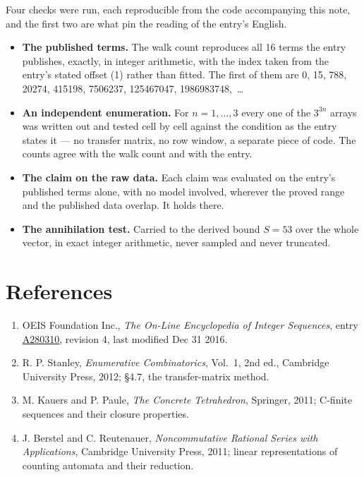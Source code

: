 \documentclass[11pt]{article}
\theoremstyle{definition}
\begin{document}
Four checks were run, each reproducible from the code accompanying this note, and the first two are what pin the reading of the entry's English.

\begin{itemize}

\item {\bfseries The published terms.} The walk count reproduces all 16 terms the entry publishes, exactly, in integer arithmetic, with the index taken from the entry's stated offset (1) rather than fitted. The first of them are 0, 15, 788, 20274, 415198, 7506237, 125467047, 1986983748,~\dots

\item {\bfseries An independent enumeration.} For $n = 1,\dots,3$ every one of the $3^{3n}$ arrays was written out and tested cell by cell against the condition as the entry states it --- no transfer matrix, no row window, a separate piece of code. The counts agree with the walk count and with the entry.

\item {\bfseries The claim on the raw data.} Each claim was evaluated on the entry's published terms alone, with no model involved, wherever the proved range and the published data overlap. It holds there.

\item {\bfseries The annihilation test.} Carried to the derived bound $S = 53$ over the whole vector, in exact integer arithmetic, never sampled and never truncated.

\end{itemize}

\section{References}

\begin{enumerate}

\item OEIS Foundation Inc., \emph{The On-Line Encyclopedia of Integer Sequences}, entry \href{https://oeis.org/A280310}{A280310}, revision 4, last modified Dec 31 2016.

\item R. P. Stanley, \emph{Enumerative Combinatorics}, Vol.~1, 2nd ed., Cambridge University Press, 2012; \S4.7, the transfer-matrix method.

\item M. Kauers and P. Paule, \emph{The Concrete Tetrahedron}, Springer, 2011; C-finite sequences and their closure properties.

\item J. Berstel and C. Reutenauer, \emph{Noncommutative Rational Series with Applications}, Cambridge University Press, 2011; linear representations of counting automata and their reduction.

\end{enumerate}
\end{document}
